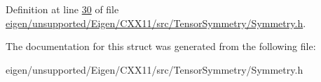 Definition at line \hyperlink{eigen_2unsupported_2_eigen_2_c_x_x11_2src_2_tensor_symmetry_2_symmetry_8h_source_l00030}{30} of file \hyperlink{eigen_2unsupported_2_eigen_2_c_x_x11_2src_2_tensor_symmetry_2_symmetry_8h_source}{eigen/unsupported/\+Eigen/\+C\+X\+X11/src/\+Tensor\+Symmetry/\+Symmetry.\+h}.



The documentation for this struct was generated from the following file\+:\begin{DoxyCompactItemize}
\item 
eigen/unsupported/\+Eigen/\+C\+X\+X11/src/\+Tensor\+Symmetry/\+Symmetry.\+h\end{DoxyCompactItemize}
